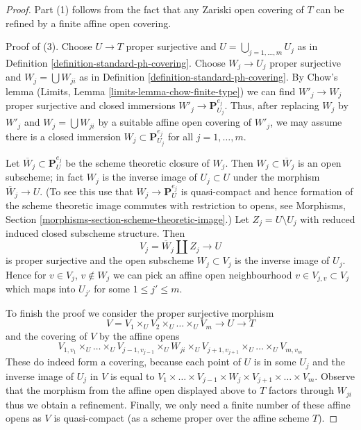 \documentclass[10pt,a4paper]{amsart}
\theoremstyle{plain}
\theoremstyle{definition}
\theoremstyle{remark}
\numberwithin{equation}{subsection}
\begin{document}
\begin{proof}
Part (1) follows from the fact that any Zariski open covering of $T$
can be refined by a finite affine open covering.

\medskip\noindent
Proof of (3). Choose $U \to T$ proper surjective and
$U = \bigcup_{j = 1, \ldots, m} U_j$ as in
Definition \ref{definition-standard-ph-covering}.
Choose $W_j \to U_j$ proper surjective and $W_j = \bigcup W_{ji}$
as in Definition \ref{definition-standard-ph-covering}.
By Chow's lemma (Limits, Lemma \ref{limits-lemma-chow-finite-type})
we can find $W'_j \to W_j$ proper surjective
and closed immersions $W'_j \to \mathbf{P}^{e_j}_{U_j}$.
Thus, after replacing $W_j$ by $W'_j$ and $W_j = \bigcup W_{ji}$
by a suitable affine open covering of $W'_j$, we may assume
there is a closed immersion $W_j \subset \mathbf{P}^{e_j}_{U_j}$
for all $j = 1, \ldots, m$.

\medskip\noindent
Let $\overline{W}_j \subset \mathbf{P}^{e_j}_U$ be the
scheme theoretic closure of $W_j$. Then $W_j \subset \overline{W}_j$
is an open subscheme; in fact $W_j$ is the inverse image of
$U_j \subset U$ under the morphism $\overline{W}_j \to U$.
(To see this use that $W_j \to \mathbf{P}^{e_j}_U$ is quasi-compact
and hence formation of the scheme theoretic image commutes
with restriction to opens, see
Morphisms, Section \ref{morphisms-section-scheme-theoretic-image}.)
Let $Z_j = U \setminus U_j$
with reduced induced closed subscheme structure.
Then
$$
V_j = \overline{W}_j \amalg Z_j \to U
$$
is proper surjective and the open subscheme $W_j \subset V_j$
is the inverse image of $U_j$. Hence for $v \in V_j$, $v \not \in W_j$
we can pick an affine open neighbourhood $v \in V_{j, v} \subset V_j$
which maps into $U_{j'}$ for some $1 \leq j' \leq m$.

\medskip\noindent
To finish the proof we consider the proper surjective morphism
$$
V = V_1 \times_U V_2 \times_U \ldots \times_U V_m
\longrightarrow U \longrightarrow T
$$
and the covering of $V$ by the affine opens
$$
V_{1, v_1} \times_U \ldots \times_U V_{j - 1, v_{j - 1}}
\times_U W_{j i} \times_U
V_{j + 1, v_{j + 1}} \times_U \ldots \times_U V_{m, v_m}
$$
These do indeed form a covering, because each point of $U$ is
in some $U_j$ and the inverse image of $U_j$ in $V$ is equal to
$V_1 \times \ldots \times V_{j - 1} \times W_j \times V_{j + 1} \times
\ldots \times V_m$. Observe that the morphism from
the affine open displayed above to $T$ factors through $W_{ji}$
thus we obtain a refinement. Finally, we only need a finite number
of these affine opens as $V$ is quasi-compact (as a scheme proper
over the affine scheme $T$).
\end{proof}
\end{document}
